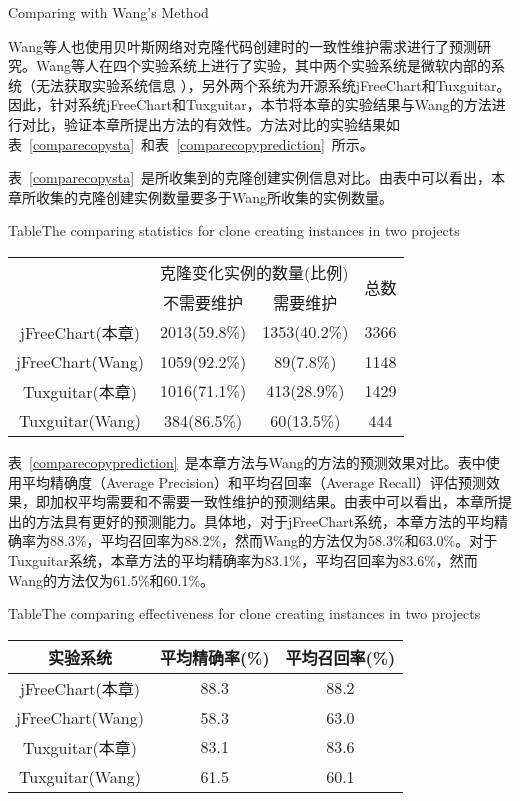 {Comparing with Wang’s Method}

Wang等人也使用贝叶斯网络对克隆代码创建时的一致性维护需求进行了预测研究\cite{wang2014predicting}。Wang等人在四个实验系统上进行了实验，其中两个实验系统是微软内部的系统（无法获取实验系统信息 ），另外两个系统为开源系统jFreeChart和Tuxguitar。因此，针对系统jFreeChart和Tuxguitar，本节将本章的实验结果与Wang的方法进行对比，验证本章所提出方法的有效性。方法对比的实验结果如表~\ref{comparecopysta}~和表~\ref{comparecopyprediction}~所示。

表~\ref{comparecopysta}~是所收集到的克隆创建实例信息对比。由表中可以看出，本章所收集的克隆创建实例数量要多于Wang所收集的实例数量。

\begin{table}[htbp]
{Table$\!$}{The comparing statistics for clone creating instances in two projects}
\vspace{0.5em}
\centering
\wuhao
\begin{tabular}{cccc}
\toprule[1.5pt]
~\multirow{2}{*}{实验系统}& \multicolumn{2}{c}{克隆变化实例的数量(比例)} & \multirow{2}{*}{总数}\\ 
 \cline{2-3}
~&{不需要维护} &{需要维护} & ~\\
\midrule[1pt]
jFreeChart(本章)&	2013(59.8\%)&	1353(40.2\%)&	3366\\
jFreeChart(Wang)&1059(92.2\%)&	89(7.8\%)&	1148\\
Tuxguitar(本章)&	1016(71.1\%)&	413(28.9\%)&	1429\\
Tuxguitar(Wang)&384(86.5\%)&	60(13.5\%)&	444\\
\bottomrule[1.5pt]
\end{tabular}
\end{table}

表~\ref{comparecopyprediction}~是本章方法与Wang的方法的预测效果对比。表中使用平均精确度（Average Precision）和平均召回率（Average Recall）评估预测效果，即加权平均需要和不需要一致性维护的预测结果。由表中可以看出，本章所提出的方法具有更好的预测能力。具体地，对于jFreeChart系统，本章方法的平均精确率为88.3\%，平均召回率为88.2\%，然而Wang的方法仅为58.3\%和63.0\%。对于Tuxguitar系统，本章方法的平均精确率为83.1\%，平均召回率为83.6\%，然而Wang的方法仅为61.5\%和60.1\%。

\begin{table}[htbp]
{Table$\!$}{The comparing effectiveness for clone creating instances in two projects}
\vspace{0.5em}
\centering
\wuhao
\begin{tabular}{ccc}
\toprule[1.5pt]
{实验系统}&{平均精确率(\%)} &{平均召回率(\%)}\\ 
\midrule[1pt]
jFreeChart(本章)&	88.3& 88.2\\
jFreeChart(Wang)&58.3&	63.0\\
Tuxguitar(本章)&	83.1&	83.6\\
Tuxguitar(Wang)&61.5&	60.1\\
\bottomrule[1.5pt]
\end{tabular}
\end{table}

